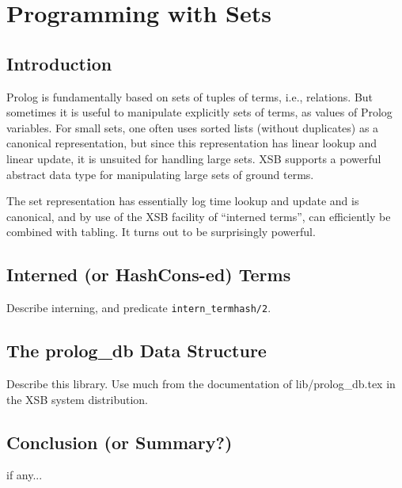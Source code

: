 \chapter{Programming with Sets}

\section{Introduction}
Prolog is fundamentally based on sets of tuples of terms, i.e.,
relations.  But sometimes it is useful to manipulate explicitly sets
of terms, as values of Prolog variables.  For small sets, one often
uses sorted lists (without duplicates) as a canonical representation,
but since this representation has linear lookup and linear update, it
is unsuited for handling large sets.  XSB supports a powerful abstract
data type for manipulating large sets of ground terms.

The set representation has essentially log time lookup and update and
is canonical, and by use of the XSB facility of ``interned terms'',
can efficiently be combined with tabling.  It turns out to be
surprisingly powerful.

\section{Interned (or HashCons-ed) Terms}

Describe interning, and predicate {\tt intern\_termhash/2}.

\section{The prolog\_db Data Structure}

Describe this library.  Use much from the documentation of
lib/prolog\_db.tex in the XSB system distribution.

\section{Conclusion (or Summary?)}
if any...
